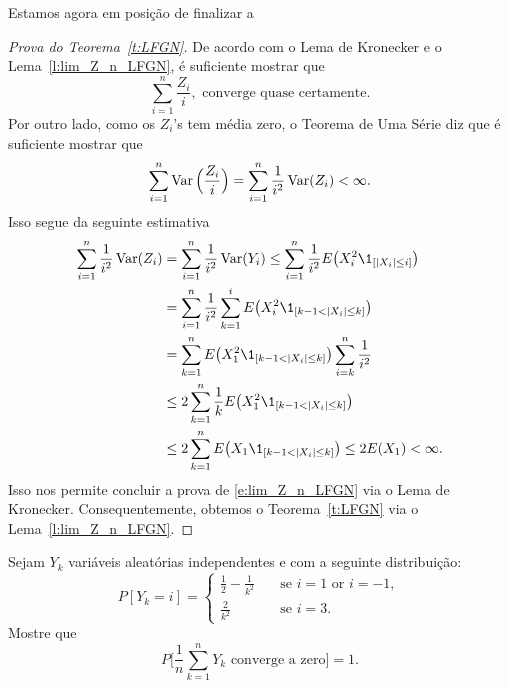 Estamos agora em posição de finalizar a
\begin{proof}[Prova do Teorema~\ref{t:LFGN}]
  De acordo com o Lema de Kronecker e o Lema~\ref{l:lim_Z_n_LFGN}, é suficiente mostrar que
  \begin{equation}
    \sum_{i=1}^n \frac{Z_i}{i}, \text{ converge quase certamente}.
  \end{equation}
  Por outro lado, como os $Z_i$'s tem média zero, o Teorema de Uma Série diz que é suficiente mostrar que
  \begin{equation}
    \sum_{i=1}^n \operatorname{Var}\Big(\frac{Z_i}{i}\Big) = \sum_{i=1}^n \frac{1}{i^2} \operatorname{Var}(Z_i) < \infty.
  \end{equation}
  Isso segue da seguinte estimativa
  \begin{equation}
    \begin{split}
      \sum_{i=1}^n \frac{1}{i^2} \Var(Z_i) & = \sum_{i=1}^n \frac{1}{i^2} \Var(Y_i) \leq \sum_{i=1}^n \frac{1}{i^2} E\big( X_i^2 \1_{[|X_i| \leq i]}\big)\\
      & = \sum_{i=1}^n \frac{1}{i^2} \sum_{k=1}^{i} E\big( X_i^2 \1_{[k-1 < |X_i| \leq k]}\big)\\
      & = \sum_{k=1}^n E\big( X_1^2 \1_{[k-1 < |X_i| \leq k]}\big) \sum_{i=k}^{n} \frac{1}{i^2}\\
      & \leq 2 \sum_{k=1}^n \frac{1}{k} E\big( X_1^2 \1_{[k-1 < |X_i| \leq k]}\big)\\
      & \leq 2 \sum_{k=1}^n E\big( X_1 \1_{[k-1 < |X_i| \leq k]}\big) \leq 2E(X_1) < \infty.
    \end{split}
  \end{equation}
  Isso nos permite concluir a prova de \eqref{e:lim_Z_n_LFGN} via o Lema de Kronecker.
  Consequentemente, obtemos o Teorema~\ref{t:LFGN} via o Lema~\ref{l:lim_Z_n_LFGN}.
\end{proof}

\begin{exercise}
  Sejam $Y_k$ variáveis aleatórias independentes e com a seguinte distribuição:
  \begin{equation}
    P[Y_k = i] =
    \begin{cases}
      \frac 12 - \frac 1{k^2} \quad & \text{se $i = 1$ or $i = -1$},\\
      \frac 2{k^2} & \text{se $i = 3$.}
    \end{cases}
  \end{equation}
  Mostre que
  \begin{equation}
    P\Big[ \frac 1n \sum_{k=1}^n Y_k \text{ converge a zero} \Big] = 1.
  \end{equation}
\end{exercise}

